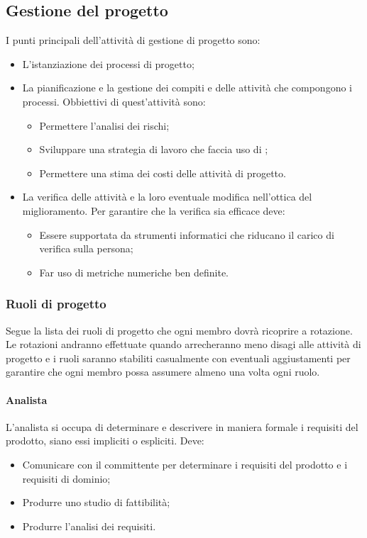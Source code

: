 \subsection{Gestione del progetto}
I punti principali dell'attività di gestione di progetto sono:
\begin{itemize}
\item L'istanziazione dei processi di progetto;
\item La pianificazione e la gestione dei compiti e delle attività che compongono i processi.
\newline
Obbiettivi di quest'attività sono:
\begin{itemize}
\item Permettere l'analisi dei rischi;
\item Sviluppare una strategia di lavoro che faccia uso di ;
\item Permettere una stima dei costi delle attività di progetto.
\end{itemize}
\item La verifica delle attività e la loro eventuale modifica nell'ottica del miglioramento.
\newline
Per garantire che la verifica sia efficace deve:
\begin{itemize}
\item Essere supportata da strumenti informatici che riducano il carico di verifica sulla persona;
\item Far uso di metriche numeriche ben definite.
\end{itemize}
\end{itemize}

\subsubsection{Ruoli di progetto}
Segue la lista dei ruoli di progetto che ogni membro dovrà ricoprire a rotazione.
Le rotazioni andranno effettuate quando arrecheranno meno disagi alle attività di progetto e i ruoli saranno stabiliti casualmente con eventuali aggiustamenti per garantire che ogni membro possa assumere almeno una volta ogni ruolo.

\paragraph{Analista} \Spazio
L'analista si occupa di determinare e descrivere in maniera formale i requisiti del prodotto, siano essi impliciti o espliciti. Deve:
\begin{itemize}
\item Comunicare con il committente per determinare i requisiti del prodotto e i requisiti di dominio;
\item Produrre uno studio di fattibilità;
\item Produrre l'analisi dei requisiti.
\end{itemize}

